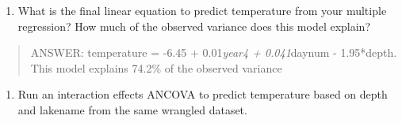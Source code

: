 \documentclass[]{article}
\newenvironment{Shaded}{\begin{snugshade}}{\end{snugshade}}
\newcommand{\KeywordTok}[1]{\textcolor[rgb]{0.13,0.29,0.53}{\textbf{#1}}}
\newcommand{\DataTypeTok}[1]{\textcolor[rgb]{0.13,0.29,0.53}{#1}}
\newcommand{\StringTok}[1]{\textcolor[rgb]{0.31,0.60,0.02}{#1}}
\newcommand{\CommentTok}[1]{\textcolor[rgb]{0.56,0.35,0.01}{\textit{#1}}}
\newcommand{\OperatorTok}[1]{\textcolor[rgb]{0.81,0.36,0.00}{\textbf{#1}}}
\newcommand{\NormalTok}[1]{#1}
\providecommand{\tightlist}{%
  \setlength{\itemsep}{0pt}\setlength{\parskip}{0pt}}
\begin{document}
\begin{enumerate}
\def\labelenumi{\arabic{enumi}.}
\setcounter{enumi}{12}
\tightlist
\item
  What is the final linear equation to predict temperature from your
  multiple regression? How much of the observed variance does this model
  explain?
\end{enumerate}

\begin{quote}
ANSWER: temperature = -6.45 + 0.01\emph{year4 + 0.041}daynum -
1.95*depth. This model explains 74.2\% of the observed variance
\end{quote}

\begin{enumerate}
\def\labelenumi{\arabic{enumi}.}
\setcounter{enumi}{13}
\tightlist
\item
  Run an interaction effects ANCOVA to predict temperature based on
  depth and lakename from the same wrangled dataset.
\end{enumerate}

\begin{Shaded}
\end{Shaded}
\end{document}

